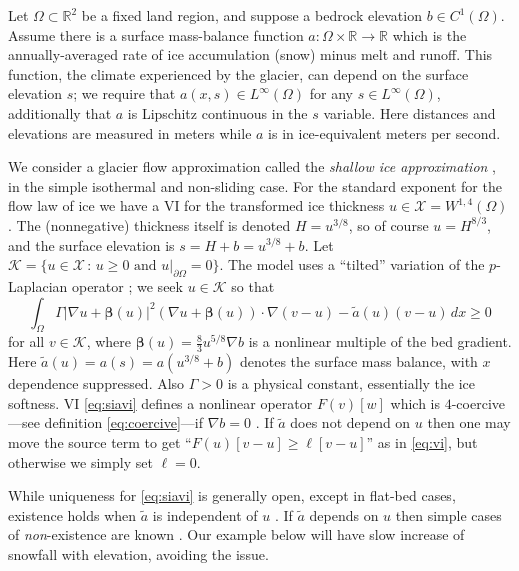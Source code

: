 \documentclass[]{interact}
\theoremstyle{plain}%
\theoremstyle{definition}
\theoremstyle{remark}
\newcommand{\RR}{\mathbb{R}}
\newcommand{\grad}{\nabla}
\newcommand{\cK}{\mathcal{K}}
\newcommand{\cX}{\mathcal{X}}
\begin{document}
Let $\Omega \subset \RR^2$ be a fixed land region, and suppose a bedrock elevation $b \in C^1(\Omega)$.   Assume there is a surface mass-balance \cite{GreveBlatter2009} function $a:\Omega \times \RR \to \RR$ which is the annually-averaged rate of ice accumulation (snow) minus melt and runoff.  This function, the climate experienced by the glacier, can depend on the surface elevation $s$; we require that $a(x,s)\in L^\infty(\Omega)$ for any $s\in L^\infty(\Omega)$, additionally that $a$ is Lipschitz continuous in the $s$ variable.  Here distances and elevations are measured in meters while $a$ is in ice-equivalent meters per second.

We consider a glacier flow approximation called the \emph{shallow ice approximation} \cite{GreveBlatter2009}, in the simple isothermal and non-sliding case.   For the standard exponent for the flow law of ice \cite{GreveBlatter2009} we have a VI for the transformed ice thickness $u\in \cX = W^{1,4}(\Omega)$.  The (nonnegative) thickness itself is denoted $H=u^{3/8}$, so of course $u=H^{8/3}$, and the surface elevation is $s=H+b=u^{3/8}+b$.  Let $\cK = \{u \in \cX\,:\,u\ge 0 \text{ and } u|_{\partial\Omega}=0\}$.  The model uses a ``tilted'' variation of the $p$-Laplacian operator \cite{JouvetBueler2012}; we seek $u\in\cK$ so that
\begin{equation}
\int_\Omega \Gamma |\grad u + \bm{\beta}(u)|^2 (\grad u + \bm{\beta}(u)) \cdot \grad (v-u) - \tilde a(u) (v-u)\,dx \ge 0 \label{eq:siavi}
\end{equation}
for all $v \in \cK$, where $\bm{\beta}(u)=\frac{8}{3} u^{5/8} \grad b$ is a nonlinear multiple of the bed gradient.  Here $\tilde a(u)=a(s)=a(u^{3/8}+b)$ denotes the surface mass balance, with $x$ dependence suppressed.  Also $\Gamma>0$ is a physical constant, essentially the ice softness.  VI \eqref{eq:siavi} defines a nonlinear operator $F(v)[w]$ which is $4$-coercive---see definition \eqref{eq:coercive}---if $\grad b=0$ \cite{JouvetBueler2012}.  If $\tilde a$ does not depend on $u$ then one may move the source term to get ``$F(u)[v-u]\ge\ell[v-u]$'' as in \eqref{eq:vi}, but otherwise we simply set $\ell=0$.

While uniqueness for \eqref{eq:siavi} is generally open, except in flat-bed cases, existence holds when $\tilde a$ is independent of $u$ \cite{JouvetBueler2012}.  If $\tilde a$ depends on $u$ then simple cases of \emph{non}-existence are known \cite{Jouvetetal2011}.  Our example below will have slow increase of snowfall with elevation, avoiding the issue.
\end{document}
